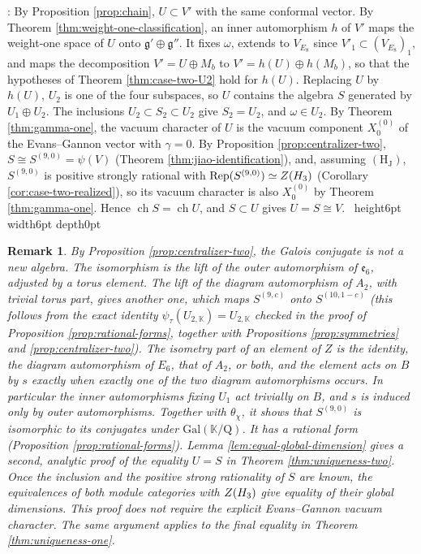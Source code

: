 \documentclass[leqno]{article}
\newcommand{\K}{\ensuremath{\mathbb{K}}}
\newcommand{\Q}{\mathrm{Q}}
\let\cal\relax
\newcommand{\cal}{\mathcal}
\newcommand{\qed}{\hfill \vrule height6pt  width6pt depth0pt}
\DeclareMathOperator{\Rep}{Rep}
\newtheorem{remark}[thm]{Remark}
\newenvironment{proof}[1][]{\noindent {\it Proof #1} : }{\hbox{~}\qed
\smallskip
}
\numberwithin{equation}{section}
\begin{document}
\begin{proof}
By Proposition \ref{prop:chain}, $U \subset V'$ with the same conformal vector. By Theorem \ref{thm:weight-one-classification}, an inner automorphism $h$ of $V'$ maps the weight-one space of $U$ onto $\mathfrak g' \oplus \mathfrak g''$. It fixes $\omega$, extends to $V_{E_8}$ since $V'_1 \subset (V_{E_8})_1$, and maps the decomposition $V' = U \oplus M_b$ to $V' = h(U) \oplus h(M_b)$, so that the hypotheses of Theorem \ref{thm:case-two-U2} hold for $h(U)$. Replacing $U$ by $h(U)$, $U_2$ is one of the four subspaces, so $U$ contains the algebra $S$ generated by $U_1 \oplus U_2$. The inclusions $U_2 \subset S_2 \subset U_2$ give $S_2 = U_2$, and $\omega \in U_2$. By Theorem \ref{thm:gamma-one}, the vacuum character of $U$ is the vacuum component $X^{(0)}_0$ of the Evans--Gannon vector with $\gamma = 0$. By Proposition \ref{prop:centralizer-two}, $S \cong S^{(9,0)} = \psi(V)$ (Theorem \ref{thm:jiao-identification}), and, assuming $\mathrm{(H_J)}$, $S^{(9,0)}$ is positive strongly rational with $\Rep(S^{(9,0)}) \simeq Z(\cal H_3)$ (Corollary \ref{cor:case-two-realized}), so its vacuum character is also $X^{(0)}_0$ by Theorem \ref{thm:gamma-one}. Hence $\operatorname{ch}S = \operatorname{ch}U$, and $S \subset U$ gives $U = S \cong V$.
\end{proof}

\begin{remark}\normalfont
\label{rem:twin}
By Proposition \ref{prop:centralizer-two}, the Galois conjugate is not a new algebra. The isomorphism is the lift of the outer automorphism of $\mathfrak e_6$, adjusted by a torus element. The lift of the diagram automorphism of $A_2$, with trivial torus part, gives another one, which maps $S^{(9,c)}$ onto $S^{(10,1-c)}$ (this follows from the exact identity $\psi_\tau(U_{2,\K}) = U_{2,\K}$ checked in the proof of Proposition \ref{prop:rational-forms}, together with Propositions \ref{prop:symmetries} and \ref{prop:centralizer-two}). The isometry part of an element of $Z$ is the identity, the diagram automorphism of $E_6$, that of $A_2$, or both, and the element acts on $B$ by $s$ exactly when exactly one of the two diagram automorphisms occurs. In particular the inner automorphisms fixing $U_1$ act trivially on $B$, and $s$ is induced only by outer automorphisms. Together with $\theta_\chi$, it shows that $S^{(9,0)}$ is isomorphic to its conjugates under $\mathrm{Gal}(\K/\Q)$. It has a rational form (Proposition \ref{prop:rational-forms}). Lemma \ref{lem:equal-global-dimension} gives a second, analytic proof of the equality $U = S$ in Theorem \ref{thm:uniqueness-two}. Once the inclusion and the positive strong rationality of $S$ are known, the equivalences of both module categories with $Z(\cal H_3)$ give equality of their global dimensions. This proof does not require the explicit Evans--Gannon vacuum character. The same argument applies to the final equality in Theorem \ref{thm:uniqueness-one}.
\end{remark}
\end{document}
